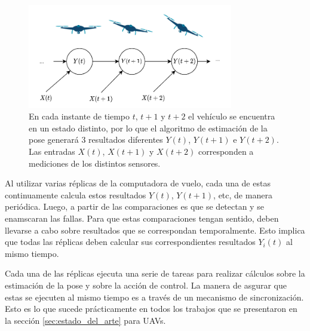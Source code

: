 
\begin{figure}[H]
    \centering
    \includegraphics[width=0.8\textwidth]{img/evolucion_estados_real_time.png}
    \caption{En cada instante de tiempo $t$, $t+1$ y $t+2$ el vehículo se encuentra en un estado distinto, por lo que el algoritmo de estimación de la pose generará 3 resultados diferentes $Y(t)$, $Y(t+1)$ e $Y(t+2)$. Las entradas $X(t)$, $X(t+1)$ y $X(t+2)$ corresponden a mediciones de los distintos sensores.}
    \label{fig:evolucion_estados_real_time}
\end{figure}

Al utilizar varias réplicas de la computadora de vuelo, cada una de estas continuamente calcula estos resultados $Y(t)$, $Y(t+1)$, etc, de manera periódica. Luego, a partir de las comparaciones es que se detectan y se enamscaran las fallas. Para que estas comparaciones tengan sentido, deben llevarse a cabo sobre resultados que se correspondan temporalmente. Esto implica que todas las réplicas deben calcular sus correspondientes resultados $Y_i(t)$ al mismo tiempo.

Cada una de las réplicas ejecuta una serie de tareas para realizar cálculos sobre la estimación de la pose y sobre la acción de control. La manera de asgurar que estas se ejecuten al mismo tiempo es a través de un mecanismo de sincronización. Esto es lo que sucede prácticamente en todos los trabajos que se presentaron en la sección \ref{sec:estado_del_arte} para UAVs.


